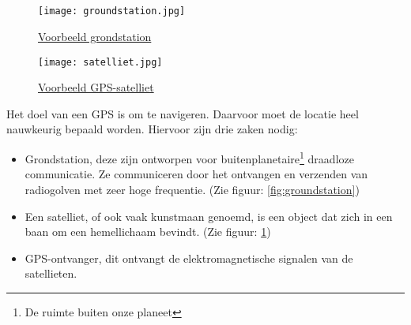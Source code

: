 \subsection{}
\begin{figure}
	 \centering
	\begin{minipage}{0.45\textwidth}
		\texttt{[image: groundstation.jpg]}
		\caption[Voorbeeld grondstation]{\href{https://www.esa.int/About_Us/ESAC/Cebreros_ground_station}{Voorbeeld grondstation \autocite{img_groundstation}}}
		\label{fig:groundstation}
	\end{minipage}\hfill
	\begin{minipage}{0.45\textwidth}
		\texttt{[image: satelliet.jpg]}
		\caption[Voorbeeld GPS-satelliet]{\href{https://spacenews.com/40530gps-2f-6-navigation-satellite-slated-to-launch-on-may-15/}{Voorbeeld GPS-satelliet \autocite{img_satellite}}}
		\label{fig:satelliet}
	\end{minipage}
\end{figure}
Het doel van een GPS is om te navigeren. Daarvoor moet de locatie heel nauwkeurig bepaald worden. Hiervoor zijn drie zaken nodig:
\begin{itemize}
	\item Grondstation, deze zijn ontworpen voor buitenplanetaire\footnote[1]{De ruimte buiten onze planeet} draadloze communicatie. Ze communiceren door het ontvangen en verzenden van radiogolven met zeer hoge frequentie. (Zie figuur: \ref{fig:groundstation})
	\item Een satelliet, of ook vaak kunstmaan genoemd, is een object dat zich in een baan om een hemellichaam bevindt. \autocite{definitie_satelliet} (Zie figuur: \ref{fig:satelliet})
	\item GPS-ontvanger, dit ontvangt de elektromagnetische signalen van de satellieten.
\end{itemize}

